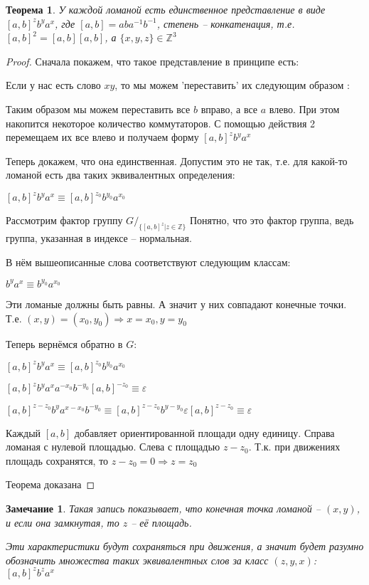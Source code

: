 \documentclass[12pt,a4paper, flushleft]{article}
\newtheorem{Th}{Теорема}[section]
\newtheorem{Zm}{Замечание}[section]
\begin{document}
\begin{Th}
	У каждой ломаной есть единственное представление в виде $[a, b]^zb^ya^x$, где $[a, b] = aba^{-1}b^{-1}$, степень -- конкатенация, т.е. $[a, b]^2 = [a, b][a, b]$, а $\{x, y, z\}\in\mathds{Z}^3$
\end{Th}
\begin{proof}
	Сначала покажем, что такое представление в принципе есть:
	
	Если у нас есть слово $xy$, то мы можем 'переставить' их следующим образом : %
	
	Таким образом мы можем переставить все $b$ вправо, а все $a$ влево. При этом накопится некоторое количество коммутаторов. С помощью действия 2 перемещаем их все влево и получаем форму $[a, b]^zb^ya^x$
	
	Теперь докажем, что она единственная. Допустим это не так, т.е. для какой-то ломаной есть два таких эквивалентных определения:
	
	$[a, b]^zb^ya^x\equiv [a, b]^{z_0}b^{y_0}a^{x_0}$ 
	
	Рассмотрим фактор группу $G/_{\{[a, b]^z|z\in \mathds{Z}\}}$ Понятно, что это фактор группа, ведь группа, указанная в индексе -- нормальная.
	
	В нём вышеописанные слова соответствуют следующим классам:
	
	$b^ya^x\equiv b^{y_0}a^{x_0}$
	
	Эти ломаные должны быть равны. А значит у них совпадают конечные точки. Т.е. $(x, y) = (x_0, y_0)\Rightarrow x = x_0, y = y_0$
	
	Теперь вернёмся обратно в $G:$
	
	$[a, b]^zb^ya^x\equiv [a, b]^{z_0}b^{y_0}a^{x_0}$
	
	$[a, b]^zb^ya^xa^{-x_0}b^{-y_0}[a, b]^{-z_0}\equiv \varepsilon$
	
	$[a, b]^{z-z_0}b^ya^{x-x_0}b^{-y_0}\equiv [a, b]^{z-z_0}b^{y-y_0} \varepsilon [a, b]^{z-z_0}\equiv \varepsilon$
	
	Каждый $[a, b]$ добавляет ориентированной площади одну единицу. Справа ломаная с нулевой площадью. Слева с площадью $z-z_0$. Т.к. при движениях площадь сохранятся, то $z-z_0 = 0\Rightarrow z=z_0$
	
	Теорема доказана
\end{proof}

\begin{Zm}
	Такая запись показывает, что конечная точка ломаной -- $(x, y)$, и если она замкнутая, то $z$ -- её площадь.
	
	Эти характеристики будут сохраняться при движения, а значит будет разумно обозначить множества таких эквивалентных слов за класс $(z, y, x)$: $[a, b]^zb^za^x$
\end{Zm}
\end{document}
